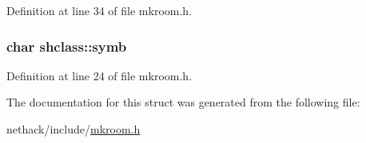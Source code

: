 Definition at line 34 of file mkroom.\+h.

\hypertarget{structshclass_a98ea09cf2eb88407663968a88979447c}{
\subsubsection[{symb}]{\setlength{\rightskip}{0pt plus 5cm}char shclass\+::symb}}\label{structshclass_a98ea09cf2eb88407663968a88979447c}


Definition at line 24 of file mkroom.\+h.



The documentation for this struct was generated from the following file\+:\begin{DoxyCompactItemize}
\item 
nethack/include/\hyperlink{mkroom_8h}{mkroom.\+h}\end{DoxyCompactItemize}
